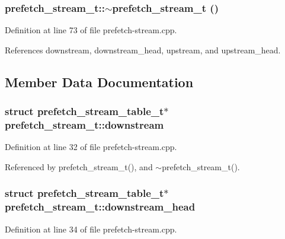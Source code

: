 \subsubsection[{$\sim$prefetch\_\-stream\_\-t}]{\setlength{\rightskip}{0pt plus 5cm}prefetch\_\-stream\_\-t::$\sim$prefetch\_\-stream\_\-t ()\hspace{0.3cm}{\tt  [inline]}}\label{classprefetch__stream__t_20a2ba2e636ad252f2e0849a8f2e47e0}




Definition at line 73 of file prefetch-stream.cpp.

References downstream, downstream\_\-head, upstream, and upstream\_\-head.

\subsection{Member Data Documentation}
\subsubsection[{downstream}]{\setlength{\rightskip}{0pt plus 5cm}struct {\bf prefetch\_\-stream\_\-table\_\-t}$\ast$ {\bf prefetch\_\-stream\_\-t::downstream}\hspace{0.3cm}{\tt  [read, protected]}}\label{classprefetch__stream__t_e1dd5b095712bb450b58c8b478ffc32c}




Definition at line 32 of file prefetch-stream.cpp.

Referenced by prefetch\_\-stream\_\-t(), and $\sim$prefetch\_\-stream\_\-t().
\subsubsection[{downstream\_\-head}]{\setlength{\rightskip}{0pt plus 5cm}struct {\bf prefetch\_\-stream\_\-table\_\-t}$\ast$ {\bf prefetch\_\-stream\_\-t::downstream\_\-head}\hspace{0.3cm}{\tt  [read, protected]}}\label{classprefetch__stream__t_23248bb10ea3c67c2bcb49569c61046b}




Definition at line 34 of file prefetch-stream.cpp.

